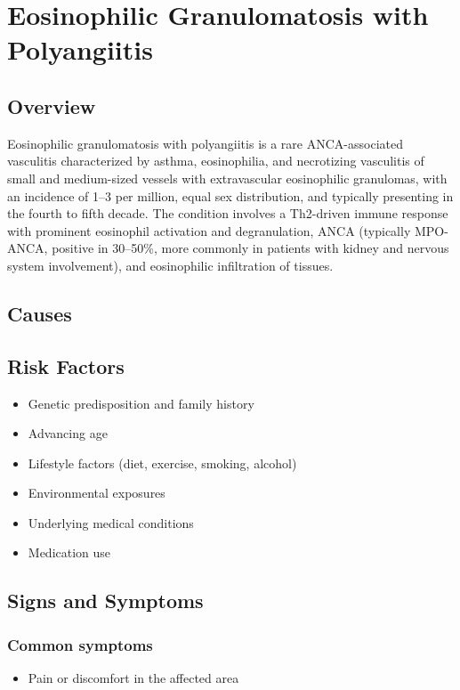 \chapter{Eosinophilic Granulomatosis with Polyangiitis}
\label{sec:Eosinophilic Granulomatosis with Polyangiitis (EGPA)}

\section{Overview}
Eosinophilic granulomatosis with polyangiitis is a rare ANCA-associated vasculitis characterized by asthma, eosinophilia, and necrotizing vasculitis of small and medium-sized vessels with extravascular eosinophilic granulomas, with an incidence of 1--3 per million, equal sex distribution, and typically presenting in the fourth to fifth decade. The condition involves a Th2-driven immune response with prominent eosinophil activation and degranulation, ANCA (typically MPO-ANCA, positive in 30--50\%, more commonly in patients with kidney and nervous system involvement), and eosinophilic infiltration of tissues.
\section{Causes}
\section{Risk Factors}

\begin{itemize}[noitemsep]
  \item Genetic predisposition and family history
  \item Advancing age
  \item Lifestyle factors (diet, exercise, smoking, alcohol)
  \item Environmental exposures
  \item Underlying medical conditions
  \item Medication use
\end{itemize}
\section{Signs and Symptoms}

\subsection{Common symptoms}
\begin{itemize}[noitemsep]
  \item Pain or discomfort in the affected area
  \end{itemize}

